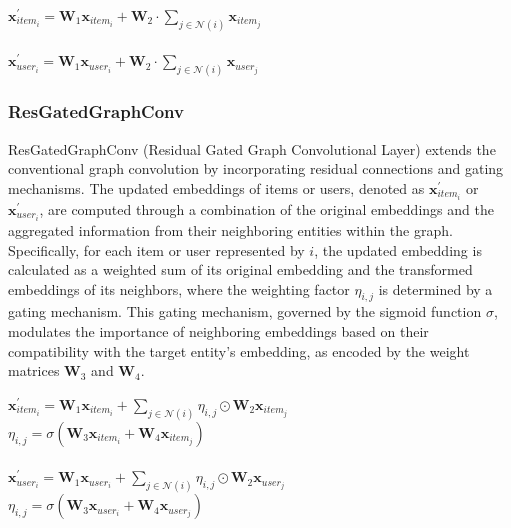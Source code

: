 \documentclass{scrartcl}
\begin{document}
\begin{center}
    $\mathbf{x}^{\prime}_{item_{i}} = \mathbf{W}_1 \mathbf{x}_{item_{i}} + \mathbf{W}_2 \cdot \sum_{j \in \mathcal{N}(i)} \mathbf{x}_{item_{j}}$ \\~\\
    $\mathbf{x}^{\prime}_{user_{i}} = \mathbf{W}_1 \mathbf{x}_{user_{i}} + \mathbf{W}_2 \cdot \sum_{j \in \mathcal{N}(i)} \mathbf{x}_{user_{j}}$
\end{center}

\subsubsection{ResGatedGraphConv\cite{resgatedgraphconv}} 

\quad ResGatedGraphConv (Residual Gated Graph Convolutional Layer) extends the conventional graph convolution by incorporating residual connections and gating mechanisms. The updated embeddings of items or users, denoted as $\mathbf{x}^{\prime}_{item_i}$ or $\mathbf{x}^{\prime}_{user_i}$, are computed through a combination of the original embeddings and the aggregated information from their neighboring entities within the graph. Specifically, for each item or user represented by $i$, the updated embedding is calculated as a weighted sum of its original embedding and the transformed embeddings of its neighbors, where the weighting factor $\eta_{i,j}$ is determined by a gating mechanism. This gating mechanism, governed by the sigmoid function $\sigma$, modulates the importance of neighboring embeddings based on their compatibility with the target entity's embedding, as encoded by the weight matrices $\mathbf{W}_3$ and $\mathbf{W}_4$. \\ 

\begin{center}
    $\mathbf{x}^{\prime}_{item_{i}} = \mathbf{W}_1 \mathbf{x}_{item_{i}} + \sum_{j \in \mathcal{N}(i)} \eta_{i,j} \odot \mathbf{W}_2 \mathbf{x}_{item_{j}}$\\ 
    $\eta_{i,j} = \sigma(\mathbf{W}_3 \mathbf{x}_{item_{i}} + \mathbf{W}_4
    \mathbf{x}_{item_{j}})$ \\~\\
    $\mathbf{x}^{\prime}_{user_{i}} = \mathbf{W}_1 \mathbf{x}_{user_{i}} + \sum_{j \in \mathcal{N}(i)} \eta_{i,j} \odot \mathbf{W}_2 \mathbf{x}_{user_{j}}$\\ 
    $\eta_{i,j} = \sigma(\mathbf{W}_3 \mathbf{x}_{user_{i}} + \mathbf{W}_4
    \mathbf{x}_{user_{j}})$
\end{center}
\end{document}
